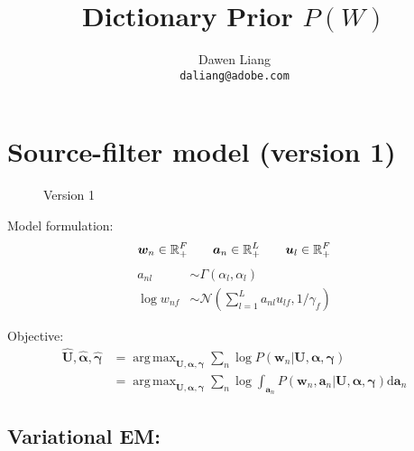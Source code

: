 \documentclass{article}
\title{Dictionary Prior $P(W)$}
\author{
Dawen Liang \\
\texttt{daliang@adobe.com}
} \date{}
\DeclareMathOperator*{\argmax}{arg\,max}
\begin{document}
%
\maketitle
%

\section{Source-filter model (version 1)}
\begin{figure}[ht]
  \centering
      
  \caption{Version 1}
\label{fig:plate}
\end{figure}

Model formulation:
\[
\bm{w}_n \in \mathbb{R}_{+}^{F} \qquad \bm{a}_n \in \mathbb{R}_{+}^{L} \qquad \bm{u}_l  \in \mathbb{R}_{+}^{F}\\
\]
\begin{align*}
a_{nl} &\sim \Gamma(\alpha_l, \alpha_l)\\
\log {w}_{nf} &\sim \mathcal{N}(\sum_{l=1}^L a_{nl} u_{lf}, 1/\gamma_f)
\end{align*}

Objective:
\begin{align*}
\hat{\mathbf{U}}, \hat{\bm{\alpha}}, \hat{\bm{\gamma}} &= \argmax_{\mathbf{U}, \bm{\alpha}, \bm{\gamma}} \sum_n \log P(\bm{w}_n | \mathbf{U}, \bm{\alpha}, \bm{\gamma})\\
&= \argmax_{\mathbf{U}, \bm{\alpha}, \bm{\gamma}} \sum_n \log \int_{\bm{a}_n} P(\bm{w}_n, \bm{a}_n | \mathbf{U}, \bm{\alpha}, \bm{\gamma}) \mathrm{d} \bm{a}_n
\end{align*}


\subsection{Variational EM:}
\end{document}
